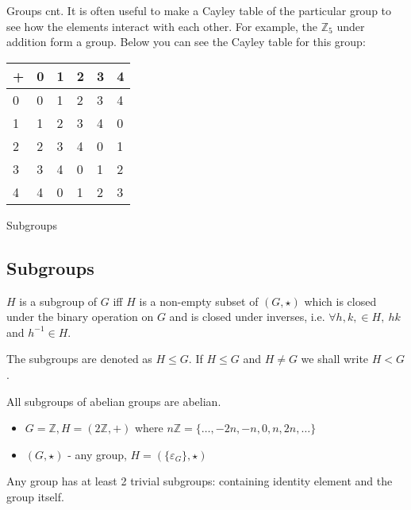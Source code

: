 \documentclass{beamer}
\begin{document}
\begin{frame}{Groups cnt.}
	It is often useful to make a Cayley table of the particular group to see 
	how the elements interact with each other. For example, the $\mathbb{Z}_5$
	under addition form a group. Below you can see the Cayley table for this 
	group:
	\begin{table}[]
		\begin{tabular}{l|lllll}
		+ & 0 & 1 & 2 & 3 & 4 \\ \hline
		0 & 0 & 1 & 2 & 3 & 4 \\
		1 & 1 & 2 & 3 & 4 & 0 \\
		2 & 2 & 3 & 4 & 0 & 1 \\
		3 & 3 & 4 & 0 & 1 & 2 \\
		4 & 4 & 0 & 1 & 2 & 3
		\end{tabular}
	\end{table}
\end{frame}

\begin{frame}{Subgroups}
	\subsection{Subgroups}
	\begin{definition}[of subgroup]
		$H$ is a subgroup of $G$ iff $H$ is a non-empty subset of $(G, \star)$ which is closed under the binary 
		operation on $G$ and is closed under inverses, i.e. $\forall h, k, \in H, \ hk$ and $h^{-1} \in H$. 
		
		The	subgroups are denoted as $H \le G$. If $H \le G$ and $H \ne G$ we shall write $H < G$.
	\end{definition}
	\begin{prop}
		All subgroups of abelian groups are abelian.
	\end{prop}
	\begin{example}
		\begin{itemize}
			\item $G = \mathbb{Z}, H = (2\mathbb{Z}, +)$ \newline
			where $n\mathbb{Z} = \{\ldots, -2n, -n, 0, n, 2n, \ldots\}$
			\item $(G, \star)$ - any group, $H = (\{\varepsilon_G\}, \star)$
		\end{itemize}
	\end{example}
	Any group has at least 2 trivial subgroups: containing identity element and the group itself.
\end{frame}
\end{document}
